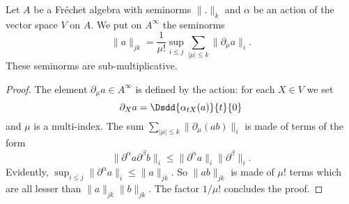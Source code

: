\begin{proposition}
Let $A$ be a Fréchet algebra with seminorms $\| . \|_k$ and $\alpha$ be an action of the vector space $V$ on $A$. We put on $A^{\infty}$ the seminorms
\begin{equation}
  \| a \|_{jk}=\frac{1}{ \mu! }\sup_{i\leq j}\sum_{| \mu |\leq k}\| \partial_{\mu}a \|_i.
\end{equation}
These seminorms are sub-multiplicative.

\end{proposition}

\begin{proof}
The element $\partial_{\mu}a\in A^{\infty}$ is defined by the action: for each $X\in V$ we set
\[ 
  \partial_X a=\Dsdd{ \alpha_{tX}(a) }{t}{0}
\]
and $\mu$ is a multi-index. The sum $\sum_{| \mu |\leq k}\| \partial_{\mu}(ab) \|_{i}$ is made of terms of the form
\[ 
  \| \partial^{\alpha}a\partial^{\beta}b \|_i\leq\| \partial^{\alpha}a \|_i\| \partial^{\beta} \|_i.
\]
Evidently, $\sup_{i\leq j}\| \partial^{\alpha}a \|_i\leq \| a \|_{jk}$. So $\| ab \|_{jk}$ is made of $\mu !$ terms which are all lesser than $\| a \|_{jk}\| b \|_{jk}$. The factor $1/\mu!$ concludes the proof.

\end{proof}


